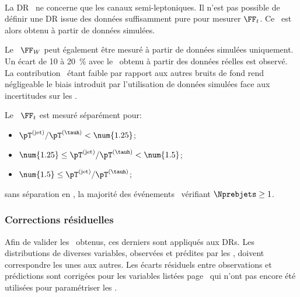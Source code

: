 \paragraph{\ttbar}
La DR \ttbar\ ne concerne que les canaux semi-leptoniques.
Il n'est pas possible de définir une DR issue des données suffisamment pure pour mesurer $\FF_t$.
Ce \fakefactor\ est alors obtenu à partir de données simulées.
\par
Le \fakefactor\ $\FF_W$ peut également être mesuré à partir de données simulées uniquement.
Un écart de \num{10} à \SI{20}{\%} avec le \fakefactor\ obtenu à partir des données réelles est observé.
La contribution \ttbar\ étant faible par rapport aux autres bruits de fond rend négligeable le biais introduit par l'utilisation de données simulées face aux incertitudes sur les \fakefactors.
\par
Le \fakefactor\ $\FF_t$ est mesuré séparément pour:
\begin{itemize}
\item $\pT^{(\text{jet})}/\pT^{(\tauh)} < \num{1.25}$;
\item $\num{1.25} \leq \pT^{(\text{jet})}/\pT^{(\tauh)} < \num{1.5}$;
\item $\num{1.5} \leq \pT^{(\text{jet})}/\pT^{(\tauh)}$;
\end{itemize}
sans séparation en \Nprebjets, la majorité des événements \ttbar\ vérifiant $\Nprebjets\geq1$.
\subsubsection{Corrections résiduelles}
Afin de valider les \fakefactors\ obtenus, ces derniers sont appliqués aux DRs.
Les distributions de diverses variables, observées et prédites par les \fakefactors, doivent correspondre les unes aux autres.
Les écarts résiduels entre observations et prédictions sont corrigées pour les variables listées page~\pageref{eq-FF_CQ_def} qui n'ont pas encore été utilisées pour paramétriser les \fakefactors.

